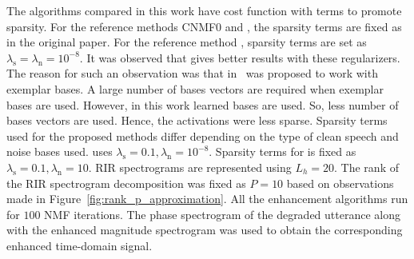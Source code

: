 The algorithms compared in this work have cost function with terms to promote sparsity. For the reference methods CNMF0 and , the sparsity terms are fixed as in the original paper. For the reference method , sparsity terms are set as $\lambda_{\text{s}} = \lambda_{\text{n}} = 10^{-8}$. It was observed that  gives better results with these regularizers. The reason for such an observation was that  in~\cite{baby2015coupled} was proposed to work with exemplar bases. A large number of bases vectors are required when exemplar bases are used. However, in this work learned bases are used. So, less number of bases vectors are used. Hence, the activations were less sparse. Sparsity terms used for the proposed methods differ depending on the type of clean speech and noise bases used.  uses $\lambda_{\text{s}}=0.1, \lambda_{\text{n}}=10^{-8}$. Sparsity terms for  is fixed as $\lambda_{\text{s}}=0.1, \lambda_{\text{n}}=10$. RIR spectrograms are represented using $L_h=20$.
The rank of the RIR spectrogram decomposition was fixed as $P = 10$ based on observations made in Figure~\ref{fig:rank_p_approximation}. 
All the enhancement algorithms run for $100$ NMF iterations. The phase spectrogram of the degraded utterance along with the enhanced magnitude spectrogram was used to obtain the corresponding enhanced time-domain signal.

